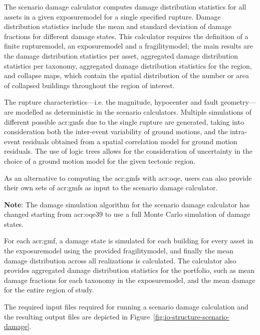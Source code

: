 The scenario damage calculator computes damage distribution statistics for all
\glspl{asset} in a given \gls{exposuremodel} for a single specified
\gls{rupture}. Damage distribution statistics include the mean and standard
deviation of damage fractions for different damage states. This calculator
requires the definition of a finite \gls{rupturemodel}, an \gls{exposuremodel}
and a \gls{fragilitymodel}; the main results are the damage distribution
statistics per \gls{asset}, aggregated damage distribution statistics per
taxonomy, aggregated damage distribution statistics for the region, and
collapse maps, which contain the spatial distribution of the number or area of
collapsed buildings throughout the region of interest.

The \gls{rupture} characteristics---i.e. the magnitude, hypocenter and fault
geometry---are modelled as deterministic in the scenario calculators. Multiple
simulations of different possible \glspl{acr:gmf} due to the single
\gls{rupture} are generated, taking into consideration both the inter-event
variability of ground motions, and the intra-event residuals obtained from a
spatial correlation model for ground motion residuals. The use of logic trees
allows for the consideration of uncertainty in the choice of a ground motion
model for the given tectonic region.

As an alternative to computing the \glspl{acr:gmf} with \glsdesc{acr:oqe},
users can also provide their own sets of \glspl{acr:gmf} as input to the
scenario damage calculator.

\textbf{Note}: The damage simulation algorithm for the scenario damage 
calculator has changed starting from \glsdesc{acr:oqe39} to use a full
Monte Carlo simulation of damage states.

For each \gls{acr:gmf}, a damage state is simulated for each building for every
\gls{asset} in the \gls{exposuremodel} using the provided \gls{fragilitymodel},
and finally the mean damage distribution across all realizations is calculated.
The calculator also provides aggregated damage distribution statistics for the
portfolio, such as mean damage fractions for each taxonomy in the 
\gls{exposuremodel}, and the mean damage for the entire region of study.

The required input files required for running a scenario damage calculation
and the resulting output files are depicted in Figure~\ref{fig:io-structure-scenario-damage}.

